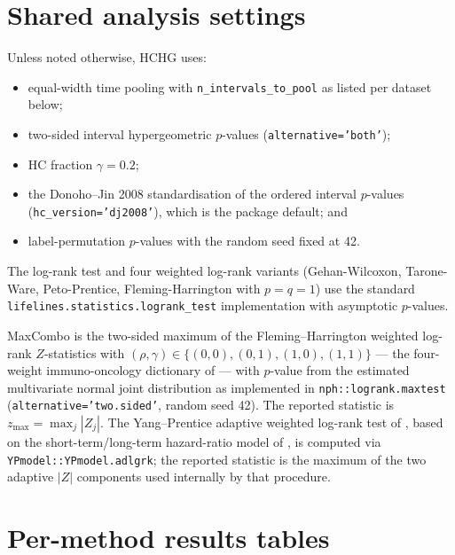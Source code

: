 \documentclass[11pt]{article}
\begin{document}
\section{Shared analysis settings}

Unless noted otherwise, HCHG uses:
\begin{itemize}
  \item equal-width time pooling with \texttt{n\_intervals\_to\_pool}
        as listed per dataset below;
  \item two-sided interval hypergeometric $p$-values
        (\texttt{alternative='both'});
  \item HC fraction $\gamma = 0.2$;
  \item the Donoho--Jin 2008 standardisation of the ordered interval
        $p$-values (\texttt{hc\_version='dj2008'}), which is the package
        default; and
  \item label-permutation $p$-values with the random seed fixed at 42.
\end{itemize}

The log-rank test and four weighted log-rank variants (Gehan-Wilcoxon,
Tarone-Ware, Peto-Prentice, Fleming-Harrington with $p=q=1$) use the
standard \texttt{lifelines.statistics.logrank\_test} implementation with
asymptotic $p$-values.

MaxCombo is the two-sided maximum of the Fleming--Harrington weighted
log-rank $Z$-statistics with
$(\rho,\gamma)\in\{(0,0),(0,1),(1,0),(1,1)\}$ --- the four-weight
immuno-oncology dictionary of \citet{lin2020maxcombo} --- with
$p$-value from the estimated multivariate normal joint distribution as
implemented in \texttt{nph::logrank.maxtest} \citep{ristl2021nph}
(\texttt{alternative='two.sided'}, random seed 42).  The reported
statistic is $z_{\max}=\max_j |Z_j|$.  The Yang--Prentice adaptive
weighted log-rank test of \citet{yang2010improved}, based on the
short-term/long-term hazard-ratio model of \citet{yang2005}, is computed
via \texttt{YPmodel::YPmodel.adlgrk}; the reported statistic is the
maximum of the two adaptive $|Z|$ components used internally by that
procedure.

\section{Per-method results tables}
\end{document}
